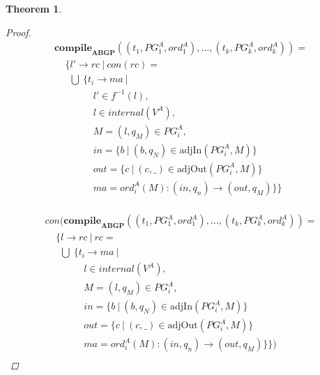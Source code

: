 \documentclass[twocolumn]{sig-alternate-10pt}
\newtheorem{thm}{Theorem}[section]
\begin{document}
\begin{thm}
\begin{proof}
  \[ \begin{array}{l}
     \textbf{compile}_\textbf{ABGP}( (t_1,PG^A_1,ord^A_1), \dots, (t_k,PG^A_k,ord^A_k) ) = \\
     ~~~~~ \{ l' \rightarrow rc ~\vert~ con(rc) = \\
     ~~~~~~~ \bigcup~ \{ t_i \rightarrow ma ~\vert~ \\
     ~~~~~~~~~~~~~~~~~~ l' \in f^{-1}(l), \\
     ~~~~~~~~~~~~~~~~~~ l \in internal(V^A), \\
     ~~~~~~~~~~~~~~~~~~ M = (l,q_M) \in PG^A_i, \\
     ~~~~~~~~~~~~~~~~~~ in = \{ b ~\vert~ (b,q_N) \in \text{adjIn}(PG^A_i,M) \} \\
     ~~~~~~~~~~~~~~~~~~ out = \{ c ~\vert~ (c,\_) \in \text{adjOut}(PG^A_i,M) \} \\
     ~~~~~~~~~~~~~~~~~~ ma = ord^A_i(M) : (in,q_n) \rightarrow (out,q_M) \} \} \\
  \end{array} \]%

  \[ \begin{array}{l}
     con(\textbf{compile}_\textbf{ABGP}( (t_1,PG^A_1,ord^A_1), \dots, (t_k,PG^A_k,ord^A_k) ) = \\
     ~~~~~ \{ l \rightarrow rc ~\vert~ rc = \\
     ~~~~~~~ \bigcup~ \{ t_i \rightarrow ma ~\vert~ \\
     ~~~~~~~~~~~~~~~~~~ l \in internal(V^A), \\
     ~~~~~~~~~~~~~~~~~~ M = (l,q_M) \in PG^A_i, \\
     ~~~~~~~~~~~~~~~~~~ in = \{ b ~\vert~ (b,q_N) \in \text{adjIn}(PG^A_i,M) \} \\
     ~~~~~~~~~~~~~~~~~~ out = \{ c ~\vert~ (c,\_) \in \text{adjOut}(PG^A_i,M) \} \\
     ~~~~~~~~~~~~~~~~~~ ma = ord^A_i(M) : (in,q_n) \rightarrow (out,q_M) \} \}) \\
  \end{array} \]%


  \end{proof}

\end{thm}
\end{document}
